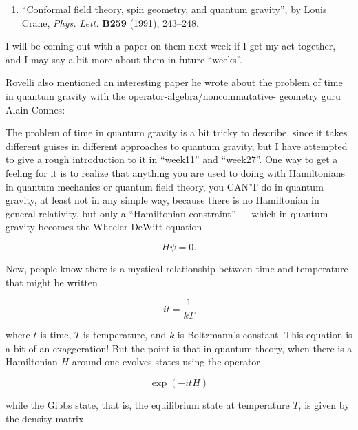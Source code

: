 \documentclass{article}
\def\tightlist{}
\renewcommand{\texttt}[1]{%
  \begingroup
  \ttfamily
  \begingroup\lccode`~=`/\lowercase{\endgroup\def~}{/\discretionary{}{}{}}%
  \begingroup\lccode`~=`[\lowercase{\endgroup\def~}{[\discretionary{}{}{}}%
  \begingroup\lccode`~=`.\lowercase{\endgroup\def~}{.\discretionary{}{}{}}%
  \catcode`/=\active\catcode`[=\active\catcode`.=\active
  \scantokens{#1\noexpand}%
  \endgroup
}
\begin{document}
\begin{enumerate}
\def\labelenumi{\arabic{enumi})}
\setcounter{enumi}{2}
\tightlist
\item
  ``Conformal field theory, spin geometry, and quantum gravity'', by
  Louis Crane, \emph{Phys. Lett.} \textbf{B259} (1991), 243--248.
\end{enumerate}

I will be coming out with a paper on them next week if I get my act
together, and I may say a bit more about them in future ``weeks''.

Rovelli also mentioned an interesting paper he wrote about the problem
of time in quantum gravity with the operator-algebra/noncommutative-
geometry guru Alain Connes:


The problem of time in quantum gravity is a bit tricky to describe,
since it takes different guises in different approaches to quantum
gravity, but I have attempted to give a rough introduction to it in
``week11'' and ``week27''. One way to get a feeling for it is to realize
that anything you are used to doing with Hamiltonians in quantum
mechanics or quantum field theory, you CAN'T do in quantum gravity, at
least not in any simple way, because there is no Hamiltonian in general
relativity, but only a ``Hamiltonian constraint'' --- which in quantum
gravity becomes the Wheeler-DeWitt equation

\[H \psi = 0.\]

Now, people know there is a mystical relationship between time and
temperature that might be written

\[it = \frac{1}{kT}\]

where \(t\) is time, \(T\) is temperature, and \(k\) is Boltzmann's
constant. This equation is a bit of an exaggeration! But the point is
that in quantum theory, when there is a Hamiltonian \(H\) around one
evolves states using the operator

\[\exp(-itH)\]

while the Gibbs state, that is, the equilibrium state at temperature
\(T\), is given by the density matrix
\end{document}
